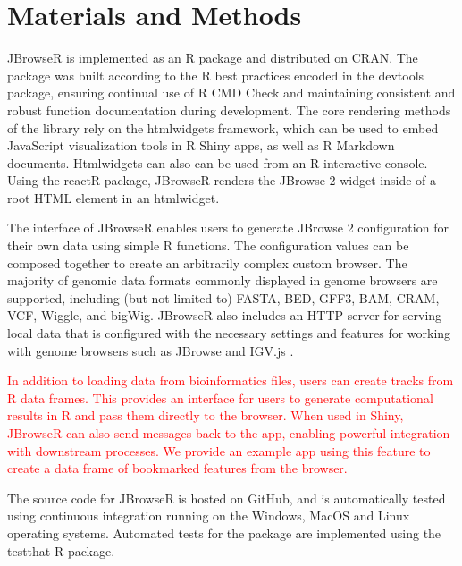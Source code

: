 \documentclass{bioinfo}
\begin{document}
\section{Materials and Methods}

JBrowseR is implemented as an R package and distributed on CRAN. The
package was built according to the R best practices encoded in the
devtools package, ensuring continual use of R CMD Check and maintaining
consistent and robust function documentation during development. The
core rendering methods of the library rely on the htmlwidgets framework,
which can be used to embed JavaScript visualization tools in R Shiny
apps, as well as R Markdown documents. Htmlwidgets can also can be used
from an R interactive console. Using the reactR package, JBrowseR
renders the JBrowse 2 widget inside of a root HTML element in an
htmlwidget.

The interface of JBrowseR enables users to generate JBrowse 2
configuration for their own data using simple R functions. The
configuration values can be composed together to create an arbitrarily
complex custom browser. The majority of genomic data formats commonly
displayed in genome browsers are supported, including (but not limited
to) FASTA, BED, GFF3, BAM, CRAM, VCF, Wiggle, and bigWig. JBrowseR also
includes an HTTP server for serving local data that is configured with
the necessary settings and features for working with genome browsers
such as JBrowse and IGV.js
\citep{robinson2011integrative, robinson2017variant}.

\textcolor{red}{
In addition to loading data from bioinformatics files, users can create tracks from
R data frames. This provides an interface for users to generate computational results
in R and pass them directly to the browser. When used in Shiny, JBrowseR can also send
messages back to the app, enabling powerful integration with downstream processes. 
We provide an example app using this feature to create a data frame of bookmarked 
features from the browser.}

The source code for JBrowseR is hosted on GitHub, and is automatically
tested using continuous integration running on the Windows, MacOS and
Linux operating systems. Automated tests for the package are implemented
using the testthat R package.
\end{document}
